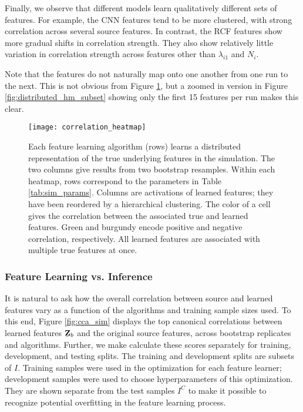 Finally, we observe that different models learn qualitatively different sets of
features. For example, the CNN features tend to be more clustered, with strong
correlation across several source features. In contrast, the RCF features show
more gradual shifts in correlation strength. They also show relatively little
variation in correlation strength across features other than $\lambda_{i1}$ and
$N_{i}$.

Note that the features do not naturally map onto one another from one run to the
next. This is not obvious from Figure \ref{fig:distributed_hm}, but a zoomed in
version in Figure \ref{fig:distributed_hm_subset} showing only the first 15
features per run makes this clear.

\begin{figure}
  \centering
  \texttt{[image: correlation\_heatmap]}
  \caption{Each feature learning algorithm (rows) learns a distributed
    representation of the true underlying features in the simulation. The two
    columns give results from two bootstrap resamples. Within each heatmap, rows
    correspond to the parameters in Table \ref{tab:sim_params}. Columns are
    activations of learned features; they have been reordered by a hierarchical
    clustering. The color of a cell gives the correlation between the associated
    true and learned features. Green and burgundy encode positive and negative
    correlation, respectively. All learned features are associated with multiple
    true features at once.}
  \label{fig:distributed_hm}
\end{figure}

\subsubsection{Feature Learning vs. Inference}

It is natural to ask how the overall correlation between source and learned
features vary as a function of the algorithms and training sample sizes used. To
this end, Figure \ref{fig:cca_sim} displays the top canonical correlations
between learned features $\underaccent{\bar}{\mathbf{Z}}_{b}$ and the original
source features, across bootstrap replicates and algorithms. Further, we make
calculate these scores separately for training, development, and testing splits.
The training and development splits are subsets of $I$. Training samples were
used in the optimization for each feature learner; development samples were used
to choose hyperparameters of this optimization. They are shown separate from the
test samples $I^{C}$ to make it possible to recognize potential overfitting in
the feature learning process.

